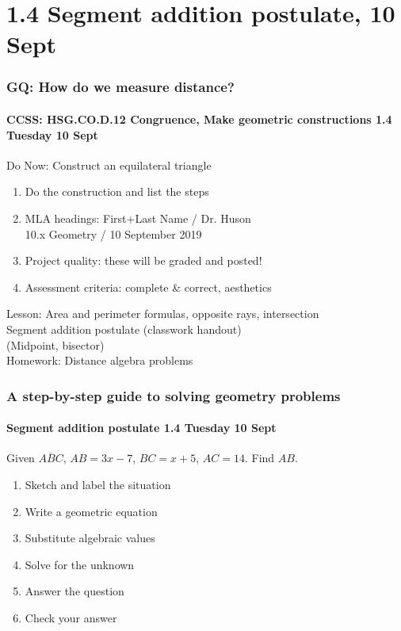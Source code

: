 \documentclass{beamer}
\begin{document}
\section{1.4 Segment addition postulate, 10 Sept}
  \frame
  {
    \frametitle{GQ: How do we measure distance?}
    \framesubtitle{CCSS: HSG.CO.D.12 Congruence, Make geometric constructions \hfill \alert{1.4 Tuesday 10 Sept}}
    \begin{block}{Do Now: Construct an equilateral triangle}
      \begin{enumerate}
        \item Do the construction and list the steps
        \item MLA headings: First+Last Name / Dr. Huson \\
        10.x Geometry / 10 September 2019 \\ \vspace{0.25cm}
        \item Project quality: these will be graded and posted!
        \item Assessment criteria: complete \& correct, aesthetics
      \end{enumerate}
      \end{block}
     Lesson: Area and perimeter formulas, opposite rays, intersection\\
    Segment addition postulate (classwork handout)\\
    (Midpoint, bisector)\\
    \vspace{0.5cm}
    Homework: Distance algebra problems\\
  }

  \frame
  {
    \frametitle{A step-by-step guide to solving geometry problems}
    \framesubtitle{Segment addition postulate \hfill \alert{1.4 Tuesday 10 Sept}}
    Given $\overline{ABC}$, $AB=3x-7$, $BC=x+5$, $AC=14$. Find ${AB}$.\\[0.5in]
        \vspace{1cm}
  \begin{enumerate}
      \item<2-> Sketch and label the situation\\
      \item<2-> Write a geometric equation\\
      \item<2-> Substitute algebraic values\\
      \item<2-> Solve for the unknown\\
      \item<2-> Answer the question\\
      \item<2-> Check your answer
    \end{enumerate}
  }
  
\end{document}

